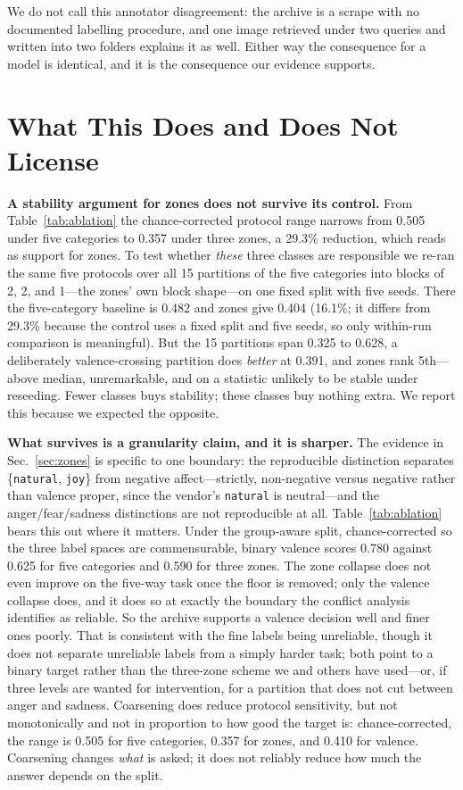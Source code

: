 \documentclass[conference,10pt]{IEEEtran}
\begin{document}
We do not call this annotator disagreement: the archive is a scrape with no
documented labelling procedure, and one image retrieved under two queries and
written into two folders explains it as well. Either way the consequence for a
model is identical, and it is the consequence our evidence supports.

\section{What This Does and Does Not License}
\label{sec:beyond}
\textbf{A stability argument for zones does not survive its control.} From
Table~\ref{tab:ablation} the chance-corrected protocol range narrows from 0.505
under five categories to 0.357 under three zones, a 29.3\% reduction, which
reads as support for zones. To test whether \emph{these} three classes are
responsible we re-ran the same five protocols over all 15 partitions of the five
categories into blocks of 2, 2, and 1---the zones' own block shape---on one
fixed split with five seeds. There the five-category baseline is 0.482 and zones
give 0.404 (16.1\%; it differs from 29.3\% because the control uses a fixed
split and five seeds, so only within-run comparison is meaningful). But the 15
partitions span 0.325 to 0.628, a deliberately valence-crossing partition does
\emph{better} at 0.391, and zones rank 5th---above median, unremarkable, and on
a statistic unlikely to be stable under reseeding. Fewer classes buys stability;
these classes buy nothing extra. We report this because we expected the
opposite.

\textbf{What survives is a granularity claim, and it is sharper.} The evidence in
Sec.~\ref{sec:zones} is specific to one boundary: the reproducible distinction
separates \{\texttt{natural}, \texttt{joy}\} from negative affect---strictly,
non-negative versus negative rather than valence proper, since the vendor's
\texttt{natural} is neutral---and the anger/fear/sadness distinctions are not
reproducible at all.
Table~\ref{tab:ablation} bears this out where it matters. Under the group-aware
split, chance-corrected so the three label spaces are commensurable, binary
valence scores 0.780 against 0.625 for five categories and 0.590 for three
zones. The zone collapse does not even improve on the five-way task once the
floor is removed; only the valence collapse does, and it does so at exactly the
boundary the conflict analysis identifies as reliable. So the archive supports a valence
decision well and finer ones poorly. That is consistent with the fine labels
being unreliable, though it does not separate unreliable labels from a simply
harder task; both point to a binary target
rather than the three-zone scheme we and others have used---or, if three levels
are wanted for intervention, for a partition that does not cut between anger and
sadness. Coarsening does reduce protocol sensitivity, but not monotonically and not in
proportion to how good the target is: chance-corrected, the range is 0.505 for
five categories, 0.357 for zones, and 0.410 for valence. Coarsening changes
\emph{what} is asked; it does not reliably reduce how much the answer depends on
the split.
\end{document}
